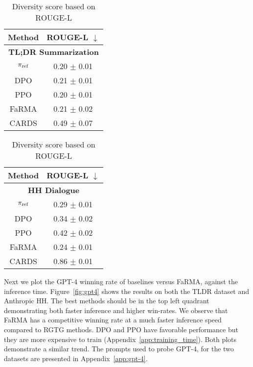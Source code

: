 \begin{table}[ht]
  \centering
  \footnotesize
  \begin{tabular}{cc}
    \toprule
    \textbf{Method} & \textbf{ROUGE-L \(\downarrow\)} \\
    \midrule
    \multicolumn{2}{c}{\textbf{TL;DR Summarization}} \\
    \midrule
    $\pi_\text{ref}$       & 0.20 $\pm$ 0.01             \\
    DPO             & 0.21 $\pm$ 0.01             \\
    PPO             & 0.20 $\pm$ 0.01            \\
    FaRMA          & 0.21 $\pm$ 0.02               \\
    CARDS           & 0.49 $\pm$ 0.07               \\

    \bottomrule
  \end{tabular}
    \hfill                
    \begin{tabular}{cc}
        \toprule
    \textbf{Method} & \textbf{ROUGE-L \(\downarrow\)} \\
    \midrule
    \multicolumn{2}{c}{\textbf{HH Dialogue}}      \\
    \midrule
    $\pi_\text{ref}$       & 0.29 $\pm$ 0.01             \\
    DPO             & 0.34 $\pm$ 0.02             \\
    PPO             & 0.42 $\pm$ 0.02            \\
    FaRMA       & 0.24 $\pm$ 0.01               \\
    CARDS           & 0.86 $\pm$ 0.01               \\
    \bottomrule
  \end{tabular}
  \caption{Diversity score based on ROUGE-L}
  \label{tab:diveristy}
   \vspace{-1em}
\end{table}


Next we plot the GPT-4 winning rate of baselines versus FaRMA, against the inference time. Figure~\ref{fig:gpt4} shows the results on both the TLDR dataset and Anthropic HH. The best methods should be in the top left quadrant demonstrating both faster inference and higher win-rates. We observe that FaRMA has a competitive winning rate at a much faster inference speed compared to RGTG methods. DPO and PPO have favorable performance but they are more expensive to train (Appendix~\ref{app:training_time}). Both plots demonstrate a similar trend. The prompts used to probe GPT-4, for the two datasets are presented in Appendix~\ref{app:gpt-4}.




